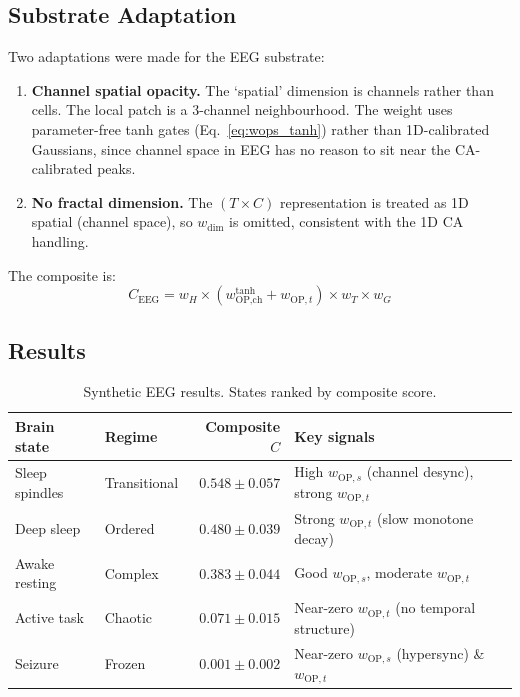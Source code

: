\documentclass[12pt,a4paper]{article}
\begin{document}
\subsection{Substrate Adaptation}

Two adaptations were made for the EEG substrate:

\begin{enumerate}[noitemsep]
  \item \textbf{Channel spatial opacity.}
    The `spatial' dimension is channels rather than cells.
    The local patch is a 3-channel neighbourhood.
    The weight uses parameter-free tanh gates (Eq.~\ref{eq:wops_tanh})
    rather than 1D-calibrated Gaussians, since channel space in EEG
    has no reason to sit near the CA-calibrated peaks.

  \item \textbf{No fractal dimension.}
    The $(T\!\times\!C)$ representation is treated as 1D spatial
    (channel space), so $w_\text{dim}$ is omitted, consistent with
    the 1D CA handling.
\end{enumerate}

The composite is:
\begin{equation}
C_\text{EEG} = w_H \times
               (w_{\text{OP},\text{ch}}^{\text{tanh}} + w_{\text{OP},t})
               \times w_T \times w_G
\end{equation}

\subsection{Results}

\begin{table}[h]
\centering
\caption{Synthetic EEG results. States ranked by composite score.}
\begin{tabular}{llrl}
\toprule
Brain state & Regime & Composite $C$ & Key signals \\
\midrule
Sleep spindles & Transitional
  & $0.548\pm0.057$
  & High $w_{\text{OP},s}$ (channel desync), strong $w_{\text{OP},t}$ \\
Deep sleep & Ordered
  & $0.480\pm0.039$
  & Strong $w_{\text{OP},t}$ (slow monotone decay) \\
Awake resting & Complex
  & $0.383\pm0.044$
  & Good $w_{\text{OP},s}$, moderate $w_{\text{OP},t}$ \\
Active task & Chaotic
  & $0.071\pm0.015$
  & Near-zero $w_{\text{OP},t}$ (no temporal structure) \\
Seizure & Frozen
  & $0.001\pm0.002$
  & Near-zero $w_{\text{OP},s}$ (hypersync) \& $w_{\text{OP},t}$ \\
\bottomrule
\end{tabular}
\end{table}
\end{document}
